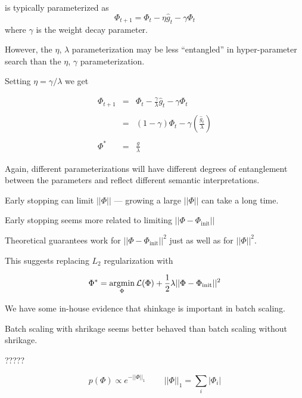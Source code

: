 {\vfill
is typically parameterized as
$$\Phi_{t+1} = \Phi_t - \eta \hat{g}_t - \gamma \Phi_t$$
where $\gamma$ is the weight decay parameter.

\vfill
{\color{red} However, the $\eta$, $\lambda$ parameterization may be less ``entangled'' in hyper-parameter search than the $\eta$, $\gamma$ parameterization.}


Setting $\eta = \gamma/\lambda$ we get

\begin{eqnarray*}
  \Phi_{t+1} & = & \Phi_t - \frac{\gamma}{\lambda} \hat{g}_t - \gamma \Phi_t \\
  \\
  & = & \left(1 -\gamma\right)\Phi_t - \gamma\left(\frac{\hat{g}_t}{\lambda}\right) \\
  \\
  \Phi^* & = & \frac{g}{\lambda}
\end{eqnarray*}

\vfill
Again, different parameterizations will have different degrees of entanglement between the parameters
and reflect different semantic interpretations.


Early stopping can limit $||\Phi||$ --- growing a large $||\Phi||$ can take a long time.

\vfill
Early stopping seems more related to limiting $||\Phi - \Phi_\mathrm{init}||$
\vfill

Theoretical guarantees work for $||\Phi - \Phi_{\mathrm{init}}||^2$ just as well as for $||\Phi||^2$.

\vfill
This suggests replacing $L_2$ regularization with

\vfill
$$\Phi^* = \operatorname*{argmin}_\Phi {\cal L}(\Phi) + \frac{1}{2}\lambda ||\Phi- \Phi_{\mathrm{init}}||^2$$


We have some in-house evidence that shinkage is important in batch scaling.

\vfill
Batch scaling with shrikage seems better behaved than batch scaling without shrikage.

\vfill
\centerline{?????}


$$p(\Phi) \propto e^{-||\Phi||_1} \;\;\;\;\;\;\;\;||\Phi||_1 = \sum_i |\Phi_i|$$

}
